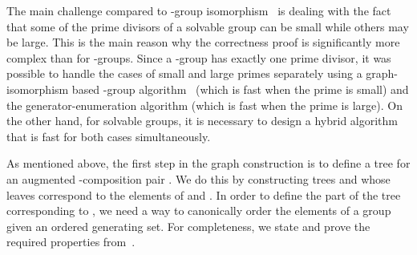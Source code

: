 
The main challenge compared to -group isomorphism~\cite{rosenbaum2013c} is dealing with the fact that some of the prime divisors of a solvable group can be small while others may be large.  This is the main reason why the correctness proof is significantly more complex than for -groups.  Since a -group has exactly one prime divisor, it was possible to handle the cases of small and large primes separately using a graph-isomorphism based -group algorithm~\cite{rosenbaum2013c} (which is fast when the prime is small) and the generator-enumeration algorithm (which is fast when the prime is large).  On the other hand, for solvable groups, it is necessary to design a hybrid algorithm that is fast for both cases simultaneously.

As mentioned above, the first step in the graph construction is to define a tree for an augmented -composition pair .  We do this by constructing trees  and  whose leaves correspond to the elements of  and .  In order to define the part of the tree corresponding to , we need a way to canonically order the elements of a group given an ordered generating set.  For completeness, we state and prove the required properties from~\cite{rosenbaum2013c}.


